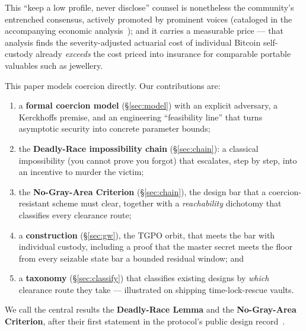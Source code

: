 This ``keep a low profile, never disclose'' counsel is nonetheless the community's
entrenched consensus, actively promoted by prominent voices (cataloged in the
accompanying economic analysis~\cite{gw-justification}); and it carries a measurable
price --- that analysis finds the severity-adjusted actuarial cost of individual
Bitcoin self-custody already \emph{exceeds} the cost priced into insurance for
comparable portable valuables such as jewellery.

This paper models coercion directly. Our contributions are:

\begin{enumerate}[nosep,leftmargin=1.6em]
  \item a \textbf{formal coercion model} (\S\ref{sec:model}) with an explicit
        adversary, a Kerckhoffs premise, and an engineering ``feasibility
        line'' that turns asymptotic security into concrete parameter bounds;
  \item the \textbf{Deadly-Race impossibility chain} (\S\ref{sec:chain}): a
        classical impossibility (you cannot prove you forgot) that escalates,
        step by step, into an incentive to murder the victim;
  \item the \textbf{No-Gray-Area Criterion} (\S\ref{sec:chain}), the design bar
        that a coercion-resistant scheme must clear, together with a
        \emph{reachability} dichotomy that classifies every clearance route;
  \item a \textbf{construction} (\S\ref{sec:gw}), the TGPO orbit, that
        meets the bar with individual custody, including a proof that the master
        secret meets the floor from every seizable state bar a bounded residual
        window; and
  \item a \textbf{taxonomy} (\S\ref{sec:classify}) that classifies existing
        designs by \emph{which} clearance route they take --- illustrated on
        shipping time-lock-rescue vaults.
\end{enumerate}

We call the central results the \textbf{Deadly-Race Lemma} and the
\textbf{No-Gray-Area Criterion}, after their first statement in the protocol's
public design record~\cite{gw-threatmodel}.

